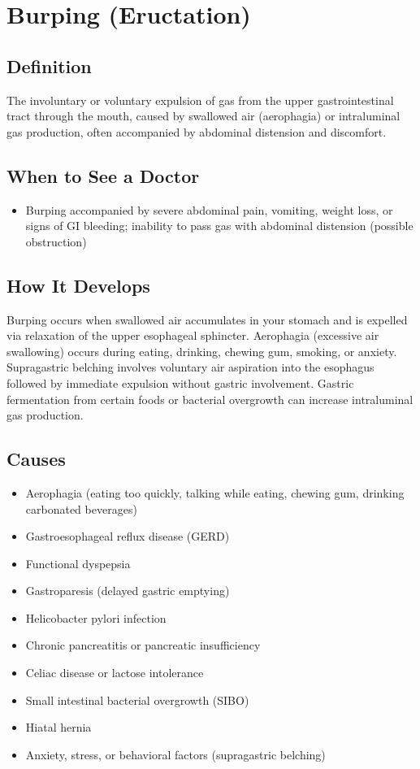 \chapter{Burping (Eructation)}

\section*{Definition}
The involuntary or voluntary expulsion of gas from the upper gastrointestinal tract through the mouth, caused by swallowed air (aerophagia) or intraluminal gas production, often accompanied by abdominal distension and discomfort.

\section*{When to See a Doctor}

\begin{itemize}
 \item Burping accompanied by severe abdominal pain, vomiting, weight loss, or signs of GI bleeding; inability to pass gas with abdominal distension (possible obstruction)
\end{itemize}

\section*{How It Develops}
Burping occurs when swallowed air accumulates in your stomach and is expelled via relaxation of the upper esophageal sphincter. Aerophagia (excessive air swallowing) occurs during eating, drinking, chewing gum, smoking, or anxiety. Supragastric belching involves voluntary air aspiration into the esophagus followed by immediate expulsion without gastric involvement. Gastric fermentation from certain foods or bacterial overgrowth can increase intraluminal gas production.

\section*{Causes}
\begin{itemize}
 \item Aerophagia (eating too quickly, talking while eating, chewing gum, drinking carbonated beverages)
 \item Gastroesophageal reflux disease (GERD)
 \item Functional dyspepsia
 \item Gastroparesis (delayed gastric emptying)
 \item Helicobacter pylori infection
 \item Chronic pancreatitis or pancreatic insufficiency
 \item Celiac disease or lactose intolerance
 \item Small intestinal bacterial overgrowth (SIBO)
 \item Hiatal hernia
 \item Anxiety, stress, or behavioral factors (supragastric belching)
\end{itemize}

